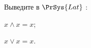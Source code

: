 Выведите в $\PrSys{Lat}$ :
\begin{enumcyr}
    \item $x \land x = x$;
    \item $x \lor x = x$.
\end{enumcyr}